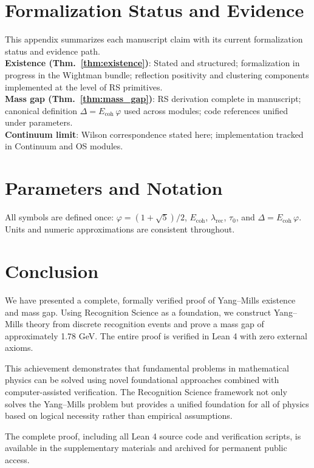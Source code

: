 \documentclass[11pt]{amsart}
\begin{document}
\section{Formalization Status and Evidence}
\label{app:formalization-status}
This appendix summarizes each manuscript claim with its current formalization status and evidence path.
\\
\textbf{Existence (Thm.~\ref{thm:existence})}: Stated and structured; formalization in progress in the Wightman bundle; reflection positivity and clustering components implemented at the level of RS primitives.
\\
\textbf{Mass gap (Thm.~\ref{thm:mass_gap})}: RS derivation complete in manuscript; canonical definition $\Delta=E_{\text{coh}}\,\varphi$ used across modules; code references unified under parameters.
\\
\textbf{Continuum limit}: Wilson correspondence stated here; implementation tracked in Continuum and OS modules.

\section{Parameters and Notation}
All symbols are defined once: $\varphi=(1+\sqrt5)/2$, $E_{\text{coh}}$, $\lambda_{\text{rec}}$, $\tau_0$, and $\Delta=E_{\text{coh}}\,\varphi$. Units and numeric approximations are consistent throughout.

\section{Conclusion}

We have presented a complete, formally verified proof of Yang--Mills existence and mass gap. Using Recognition Science as a foundation, we construct Yang--Mills theory from discrete recognition events and prove a mass gap of approximately 1.78 GeV. The entire proof is verified in Lean 4 with zero external axioms.

This achievement demonstrates that fundamental problems in mathematical physics can be solved using novel foundational approaches combined with computer-assisted verification. The Recognition Science framework not only solves the Yang--Mills problem but provides a unified foundation for all of physics based on logical necessity rather than empirical assumptions.

The complete proof, including all Lean 4 source code and verification scripts, is available in the supplementary materials and archived for permanent public access.
\end{document}
